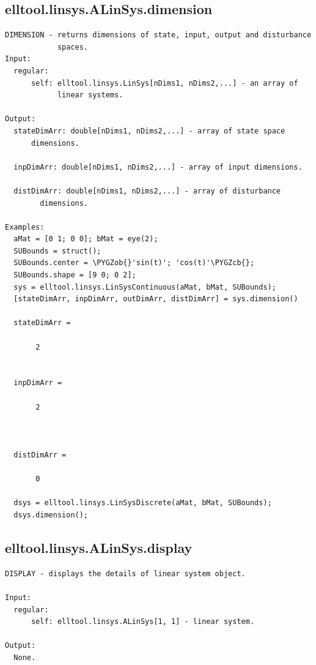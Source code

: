 \documentclass[letterpaper,10pt,english]{sphinxmanual}
\def\PYGZob{\char`\{}
\def\PYGZcb{\char`\}}
\begin{document}
\subsection{elltool.linsys.ALinSys.dimension}
\label{chap_functions:elltool-linsys-alinsys-dimension}
\begin{Verbatim}[commandchars=\\\{\}]
DIMENSION - returns dimensions of state, input, output and disturbance
            spaces.
Input:
  regular:
      self: elltool.linsys.LinSys[nDims1, nDims2,...] - an array of
            linear systems.

Output:
  stateDimArr: double[nDims1, nDims2,...] - array of state space
      dimensions.

  inpDimArr: double[nDims1, nDims2,...] - array of input dimensions.

  distDimArr: double[nDims1, nDims2,...] - array of disturbance
        dimensions.

Examples:
  aMat = [0 1; 0 0]; bMat = eye(2);
  SUBounds = struct();
  SUBounds.center = \PYGZob{}'sin(t)'; 'cos(t)'\PYGZcb{};
  SUBounds.shape = [9 0; 0 2];
  sys = elltool.linsys.LinSysContinuous(aMat, bMat, SUBounds);
  [stateDimArr, inpDimArr, outDimArr, distDimArr] = sys.dimension()

  stateDimArr =

       2


  inpDimArr =

       2



  distDimArr =

       0

  dsys = elltool.linsys.LinSysDiscrete(aMat, bMat, SUBounds);
  dsys.dimension();
\end{Verbatim}


\subsection{elltool.linsys.ALinSys.display}
\label{chap_functions:elltool-linsys-alinsys-display}
\begin{Verbatim}[commandchars=\\\{\}]
DISPLAY - displays the details of linear system object.

Input:
  regular:
      self: elltool.linsys.ALinSys[1, 1] - linear system.

Output:
  None.
\end{Verbatim}
\end{document}
